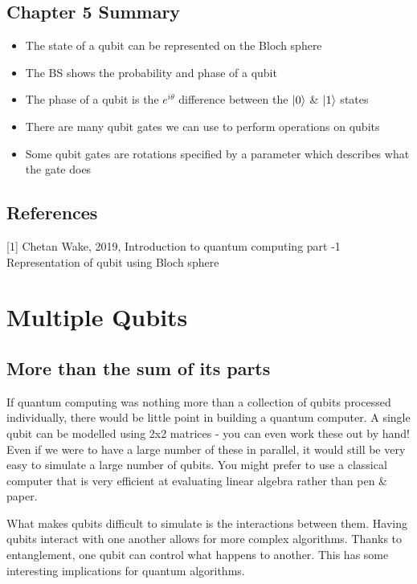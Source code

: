 \documentclass{book}
\begin{document}
\section{Chapter 5 Summary }

\begin{itemize}
    \item The state of a qubit can be represented on the Bloch sphere
    \item The BS shows the probability and phase of a qubit 
    \item The phase of a qubit is the $e^{i\theta}$ difference between the $\ket{0}$ \& $\ket{1}$ states
    \item There are many qubit gates we can use to perform operations on qubits
    \item Some qubit gates are rotations specified by a parameter which describes what the gate does
    
\end{itemize}

\section{References}

[1] Chetan Wake, 2019, Introduction to quantum computing part -1 Representation of qubit using Bloch sphere

\chapter{Multiple Qubits}

\section{ More than the sum of its parts}

If quantum computing was nothing more than a collection of qubits processed individually, there would be little point in building a quantum computer. A single qubit can be modelled using 2x2 matrices - you can even work these out by hand! Even if we were to have a large number of these in parallel, it would still be very easy to simulate a large number of qubits. You might prefer to use a classical computer that is very efficient at evaluating linear algebra rather than pen \& paper. 

What makes qubits difficult to simulate is the interactions between them. Having qubits interact with one another allows for more complex algorithms. Thanks to entanglement, one qubit can control what happens to another. This has some interesting implications for quantum algorithms. 
\end{document}
